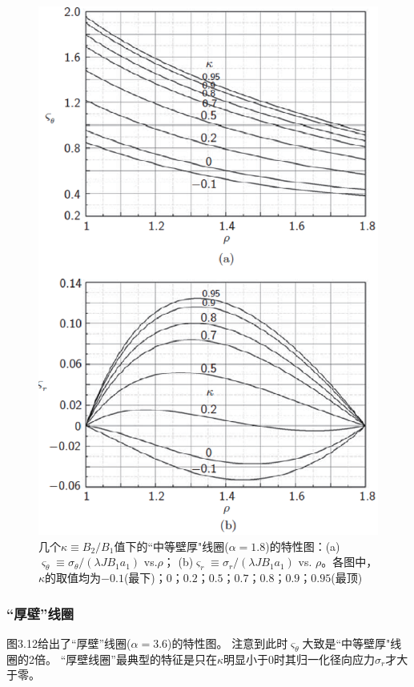 \begin{figure}
  \centering
 \includegraphics[scale=0.7]{chpt3/figs/fig3.11.eps}
  \caption{几个$\kappa\equiv B_2/B_1$值下的``中等壁厚"线圈($\alpha=1.8$)的特性图：(a)$\varsigma_\theta\equiv \sigma_\theta/(\lambda J B_1 a_1)$ vs.$\rho$；
  (b)$\varsigma_r \equiv \sigma_r/(\lambda J B_1 a_1)$ vs. $\rho$。各图中，$\kappa$的取值均为$-0.1$(最下)；$0$；$0.2$；$0.5$；$0.7$；$0.8$；$0.9$；$0.95$(最顶) }
\end{figure}

\subsubsection{``厚壁''线圈}
图3.12给出了``厚壁''线圈($\alpha=3.6$)的特性图。
注意到此时$\varsigma_\theta$大致是``中等壁厚"线圈的2倍。
``厚壁线圈''最典型的特征是只在$\kappa$明显小于0时其归一化径向应力$\sigma_r$才大于零。


